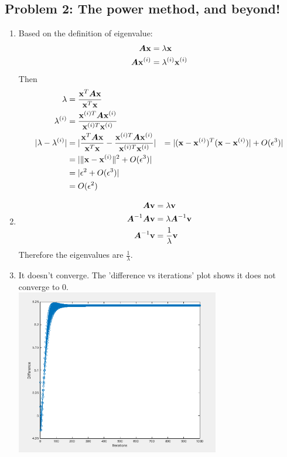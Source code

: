 \documentclass{article}
\begin{document}
\hypertarget{}{}
\subsection*{{Problem 2: The power method, and beyond!}}
\label{}
\begin{enumerate} 
\item 
Based on the definition of eigenvalue: \\
\begin{align*} 
\mA\vx& = \lambda\vx \\
\mA\vx^{(i)} &=\lambda^{(i)}\vx^{(i)}
\end{align*}
Then 
\begin{align*} 
\lambda &= \frac{\vx^T\mA\vx}{\vx^T\vx} \\
\lambda^{(i)} &= \frac{\vx^{(i)T}\mA\vx^{(i)}}{\vx^{(i)T}\vx^{(i)}} \\
|\lambda-\lambda^{(i)}| &= |  \frac{\vx^T\mA\vx}{\vx^T\vx} - \frac{\vx^{(i)T}\mA\vx^{(i)}}{\vx^{(i)T}\vx^{(i)}}|
& = |(\vx-\vx^{(i)})^T(\vx-\vx^{(i)})|+ O(\epsilon^3)| \\
& = |\|\vx-\vx^{(i)}\|^2 +O(\epsilon^3)| \\
& = |\epsilon^2+O(\epsilon^3)| \\
& = O(\epsilon^2) 
\end{align*}
\item 
\begin{align*} 
\mA\vv & = \lambda\vv \\
\mA^{-1}\mA\vv & =\lambda\mA^{-1}\vv \\
\mA^{-1}\vv &=\frac{1}{\lambda}\vv
\end{align*}
Therefore the eigenvalues are $\frac{1}{\lambda} $. 

\item 
It doesn't converge.  The 'difference vs iterations' plot shows it does not converge to 0. \\
\includegraphics[width=0.7\textwidth]{problem2_3} 



\end{enumerate}
\end{document}
